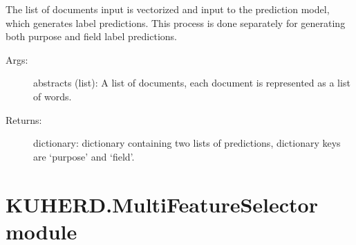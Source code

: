 \documentclass[letterpaper,10pt,english]{sphinxmanual}
\begin{document}
\begin{fulllineitems}
\begin{fulllineitems}
The list of documents input is vectorized and input to the prediction model, which generates label predictions.
This process is done separately for generating both purpose and field label predictions.
\begin{description}
\item[{Args:}] \leavevmode
abstracts (list): A list of documents, each document is represented as a list of words.

\item[{Returns:}] \leavevmode
dictionary: dictionary containing two lists of predictions, dictionary keys are `purpose' and `field'.

\end{description}

\end{fulllineitems}


\end{fulllineitems}



\section{KUHERD.MultiFeatureSelector module}
\label{\detokenize{KUHERD:module-KUHERD.MultiFeatureSelector}}\label{\detokenize{KUHERD:kuherd-multifeatureselector-module}}
\end{document}
